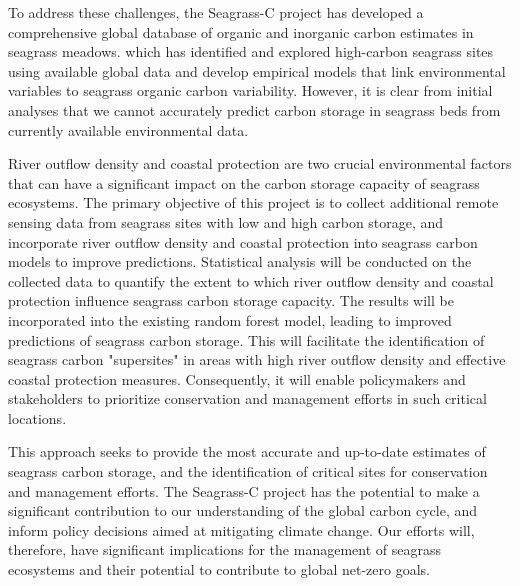 \documentclass[a4paper]{report}
\begin{document}
To address these challenges, the Seagrass-C project has developed a comprehensive global database of organic and inorganic carbon estimates in seagrass meadows. which has identified and explored high-carbon seagrass sites using available global data and develop empirical models that link environmental variables to seagrass organic carbon variability. However, it is clear from initial analyses that we cannot accurately predict carbon storage in seagrass beds from currently available environmental data.

River outflow density and coastal protection are two crucial environmental factors that can have a significant impact on the carbon storage capacity of seagrass ecosystems. The primary objective of this project is to collect additional remote sensing data from seagrass sites with low and high carbon storage, and incorporate river outflow density and coastal protection into seagrass carbon models to improve predictions. Statistical analysis will be conducted on the collected data to quantify the extent to which river outflow density and coastal protection influence seagrass carbon storage capacity. The results will be incorporated into the existing random forest model, leading to improved predictions of seagrass carbon storage. This will facilitate the identification of seagrass carbon "supersites" in areas with high river outflow density and effective coastal protection measures. Consequently, it will enable policymakers and stakeholders to prioritize conservation and management efforts in such critical locations.

This approach seeks to provide the most accurate and up-to-date estimates of seagrass carbon storage, and the identification of critical sites for conservation and management efforts. The Seagrass-C project has the potential to make a significant contribution to our understanding of the global carbon cycle, and inform policy decisions aimed at mitigating climate change. Our efforts will, therefore, have significant implications for the management of seagrass ecosystems and their potential to contribute to global net-zero goals.
\end{document}
